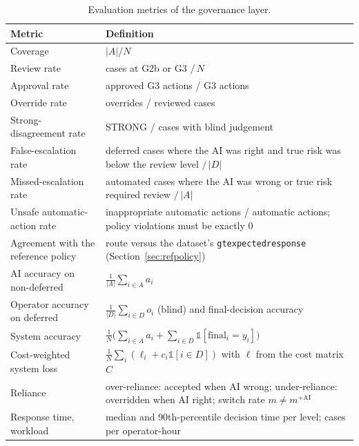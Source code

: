 \documentclass[11pt,a4paper]{article}
\renewcommand{\_}{\textunderscore\allowbreak}
\newcommand{\lvl}[1]{\textsf{#1}}
\begin{document}
\begin{table}[H]
\centering\small
\begin{tabularx}{\textwidth}{@{}>{\raggedright\arraybackslash}p{4.0cm}L@{}}
\toprule
\textbf{Metric} & \textbf{Definition} \\
\midrule
Coverage & $|A|/N$ \\
Review rate & cases at \lvl{G2b} or \lvl{G3} $/\,N$ \\
Approval rate & approved \lvl{G3} actions / \lvl{G3} actions \\
Override rate & overrides / reviewed cases \\
Strong-disagreement rate & STRONG / cases with blind judgement \\
False-escalation rate & deferred cases where the AI was right and true risk was below the review level $/\,|D|$ \\
Missed-escalation rate & automated cases where the AI was wrong or true risk required review $/\,|A|$ \\
Unsafe automatic-action rate & inappropriate automatic actions / automatic actions; policy violations must be exactly 0 \\
Agreement with the reference policy & route versus the dataset's \texttt{gt\_expected\_response} (Section~\ref{sec:refpolicy}) \\
AI accuracy on non-deferred & $\frac1{|A|}\sum_{i\in A}a_i$ \\
Operator accuracy on deferred & $\frac1{|D|}\sum_{i\in D}o_i$ (blind) and final-decision accuracy \\
System accuracy & $\frac1N\bigl(\sum_{i\in A}a_i+\sum_{i\in D}\mathbb 1[\mathrm{final}_i=y_i]\bigr)$ \\
Cost-weighted system loss & $\frac1N\sum_i(\ell_i+c_i\mathbb 1[i\in D])$ with $\ell$ from the cost matrix $C$ \\
Reliance & over-reliance: accepted when AI wrong; under-reliance: overridden when AI right; switch rate $m\ne m^{+\mathrm{AI}}$ \\
Response time, workload & median and 90th-percentile decision time per level; cases per operator-hour \\
\bottomrule
\end{tabularx}
\caption{Evaluation metrics of the governance layer.}
\end{table}
\end{document}
